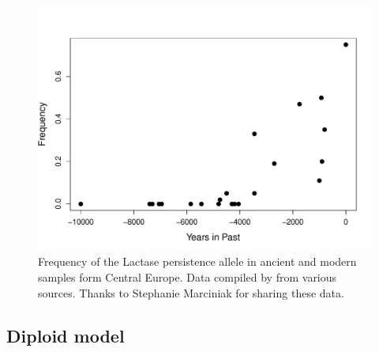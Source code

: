 \begin{figure}
\begin{center}
\includegraphics[width= \textwidth]{Rcode/Lactase_example/Lactase_freq_time.pdf}
\end{center}
\caption{Frequency of the Lactase persistence allele in ancient and
  modern samples form Central Europe. Data compiled by
  \citet{marciniak2017} from various sources. Thanks to Stephanie
  Marciniak for sharing these data. } \label{fig:LCT_freqs}
\end{figure}

\subsection{Diploid model}

